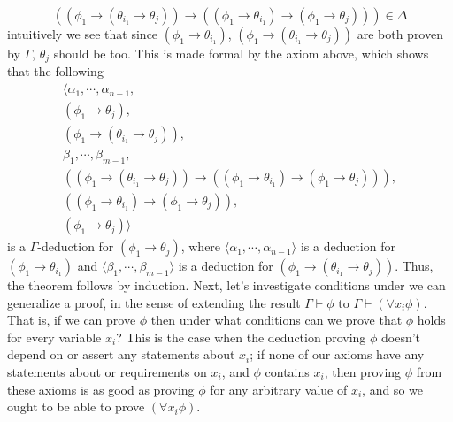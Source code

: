 \documentclass{article}
\begin{document}
{    $$ ((\phi_1 \rightarrow (\theta_{i_1} \rightarrow \theta_j)) \rightarrow ((\phi_1 \rightarrow \theta_{i_1}) \rightarrow (\phi_1 \rightarrow \theta_j))) \in \Delta $$
intuitively we see that since $ (\phi_1 \rightarrow \theta_{i_1}) $, $ (\phi_1 \rightarrow (\theta_{i_1} \rightarrow \theta_j)) $ are both proven by $ \Gamma $, $ \theta_j $ should be too. This is made formal by the axiom above, which shows that the following
$$ \begin{gathered}
    \langle \alpha_1, \cdots, \alpha_{n - 1}, \\
    (\phi_1 \rightarrow \theta_j), \\
    (\phi_1 \rightarrow (\theta_{i_1} \rightarrow \theta_j)), \\
    \beta_1, \cdots, \beta_{m - 1}, \\
    ((\phi_1 \rightarrow (\theta_{i_1} \rightarrow \theta_j)) \rightarrow ((\phi_1 \rightarrow \theta_{i_1}) \rightarrow (\phi_1 \rightarrow \theta_j))), \\
    ((\phi_1 \rightarrow \theta_{i_1}) \rightarrow (\phi_1 \rightarrow \theta_j)), \\
    (\phi_1 \rightarrow \theta_j) \rangle \nonumber
\end{gathered} $$
is a $ \Gamma $-deduction for $ (\phi_1 \rightarrow \theta_j) $, where $ \langle \alpha_1, \cdots, \alpha_{n - 1} \rangle $ is a deduction for $ (\phi_1 \rightarrow \theta_{i_1}) $ and $ \langle \beta_1, \cdots, \beta_{m - 1} \rangle $ is a deduction for $ (\phi_1 \rightarrow (\theta_{i_1} \rightarrow \theta_j)) $.
\n
Thus, the theorem follows by induction.}
Next, let's investigate conditions under we can generalize a proof, in the sense of extending the result $ \Gamma \vdash \phi $ to $ \Gamma \vdash (\forall x_i \phi) $. That is, if we can prove $ \phi $ then under what conditions can we prove that $ \phi $ holds for every variable $ x_i $? This is the case when the deduction proving $ \phi $ doesn't depend on or assert any statements about $ x_i $; if none of our axioms have any statements about or requirements on $ x_i $, and $ \phi $ contains $ x_i $, then proving $ \phi $ from these axioms is as good as proving $ \phi $ for any arbitrary value of $ x_i $, and so we ought to be able to prove $ (\forall x_i \phi) $.
\end{document}
